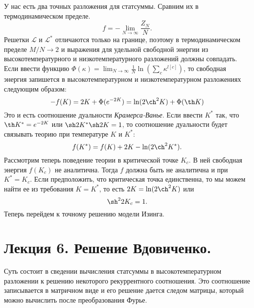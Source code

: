 \documentclass[a4paper,12pt]{article}
\theoremstyle{definition}
\theoremstyle{definition}
\theoremstyle{definition}
\begin{document}
У нас есть два точных разложения для статсуммы. Сравним их в термодинамическом пределе.
\begin{equation}
  \label{eq:109}
  f=-\lim_{N\to \infty}\frac{Z_N}{N}.
\end{equation}
Решетки $\mathcal{L}$ и $\mathcal{L}^*$ отличаются только на границе, поэтому в термодинамическом пределе $M/N\to 2$ и выражения для удельной свободной энергии из высокотемпературного и низкотемпературного разложений должны совпадать. Если ввести функцию $\Phi(\kappa)=\lim_{N\to \infty}\frac{1}{N} \ln \left(\sum_c \kappa^{l[c]}\right)$, то свободная энергия запишется в высокотемпературном и низкотемпературном разложениях следующим образом:
\begin{equation}
  \label{eq:110}
  -f(K)=2K+\Phi(e^{-2K})=\ln(2\ch^2 K)+\Phi(\th K)
\end{equation}
Это и есть соотношение дуальности {\it Крамерса-Ванье}. Если ввести $K^*$ так, что $\th K^*=e^{-2K}$ или $\sh 2K^* \sh 2K=1$, то соотношение дуальности будет связывать теорию при температуре $K$ и $K^*$:
\begin{equation}
  \label{eq:111}
  f(K^*)=f(K)+2K-\ln(2\ch^2 K^*).
\end{equation}
Рассмотрим теперь поведение теории в критической точке $K_c$. В ней свободная энергия $f(K_c)$ не аналитична. Тогда $f$ должна быть не аналитична и при $K^*=K_c$. Если предположить, что критическая точка единственна, то мы можем найти ее из требования $K=K^*$, то есть $2K=\ln(2\ch^2 K)$ или
\begin{equation}
  \label{eq:112}
  \sh^2 2K_c=1.
\end{equation}
Теперь перейдем к точному решению модели Изинга.
\section{Лекция 6. Решение Вдовиченко.}
\label{sec:lecture-6}
Суть состоит в сведении вычисления статсуммы в высокотемпературном разложении к решению некоторого рекуррентного соотношения. Это соотношение записывается в матричном виде и его решение дается следом матрицы, который можно вычислить после преобразования Фурье.

{}

\end{document}
